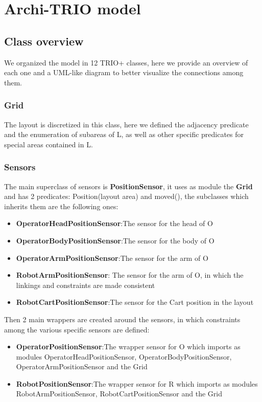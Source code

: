 \documentclass[a4paper]{article}
\begin{document}
\clearpage
\section{Archi-TRIO model}

\subsection{Class overview}
We organized the model in 12 TRIO+ classes, here we provide an overview of each one and a UML-like diagram to better visualize the connections among them.

\subsubsection{Grid}
The layout is discretized in this class, here we defined the adjacency predicate and the enumeration of subareas of L, as well as other specific predicates for special areas contained in L.

\subsubsection{Sensors}
The main superclass of sensors is \textbf{PositionSensor}, it uses as module the \textbf{Grid} and has 2 predicates: Position(layout area) and moved(), the subclasses which inherits them are the following ones:

\begin{itemize}
    \item \textbf{OperatorHeadPositionSensor}:\@ The sensor for the head of O
    \item \textbf{OperatorBodyPositionSensor}:\@ The sensor for the body of O
    \item \textbf{OperatorArmPositionSensor}:\@ The sensor for the arm of O
    \item \textbf{RobotArmPositionSensor}:\@
The sensor for the arm of O, in which the linkings and constraints are made consistent
    \item \textbf{RobotCartPositionSensor}:\@ The sensor for the Cart position in the layout
\end{itemize}

Then 2 main wrappers are created around the sensors, in which constraints among the various specific sensors are defined:
\begin{itemize}
    \item \textbf{OperatorPositionSensor}:\@ The wrapper sensor for O which imports as modules OperatorHeadPositionSensor, OperatorBodyPositionSensor, OperatorArmPositionSensor and the Grid
    \item \textbf{RobotPositionSensor}:\@ The wrapper sensor for R which imports as modules RobotArmPositionSensor, RobotCartPositionSensor and the Grid

\end{itemize}
\end{document}
